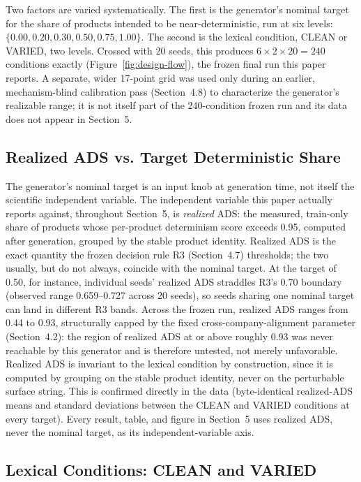 \documentclass[11pt]{article}
\begin{document}
Two factors are varied systematically. The first is the generator's nominal
target for the share of products intended to be near-deterministic, run at
six levels: $\{0.00, 0.20, 0.30, 0.50, 0.75, 1.00\}$. The second is the
lexical condition, CLEAN or VARIED, two levels. Crossed with 20 seeds, this
produces $6 \times 2 \times 20 = 240$ conditions exactly (Figure~\ref{fig:design-flow}), the frozen final
run this paper reports. A separate, wider 17-point grid was used only during
an earlier, mechanism-blind calibration pass (Section~4.8) to characterize
the generator's realizable range; it is not itself part of the 240-condition
frozen run and its data does not appear in Section~5.

\subsection{Realized ADS vs. Target Deterministic Share}
\label{sec:realized-ads}

The generator's nominal target is an input knob at generation time, not
itself the scientific independent variable. The independent variable this
paper actually reports against, throughout Section~5, is \emph{realized}
ADS: the measured, train-only share of products whose per-product
determinism score exceeds 0.95, computed after generation, grouped by the
stable product identity. Realized ADS is the exact quantity the frozen
decision rule R3 (Section~4.7) thresholds; the two usually, but do not
always, coincide with the nominal target. At the target of 0.50, for
instance, individual seeds' realized ADS straddles R3's 0.70 boundary
(observed range 0.659--0.727 across 20 seeds), so seeds sharing one nominal
target can land in different R3 bands. Across the frozen run, realized ADS
ranges from 0.44 to 0.93, structurally capped by the
fixed cross-company-alignment parameter (Section~4.2): the region of
realized ADS at or above roughly 0.93 was never reachable by this generator
and is therefore untested, not merely unfavorable. Realized ADS is invariant
to the lexical condition by construction, since it is computed by grouping on
the stable product identity, never on the perturbable surface string. This
is confirmed directly in the data (byte-identical realized-ADS means and
standard deviations between the CLEAN and VARIED conditions at every target).
Every result, table, and figure in Section~5 uses realized ADS, never the
nominal target, as its independent-variable axis.

\subsection{Lexical Conditions: CLEAN and VARIED}
\label{sec:lexical-conditions}
\end{document}
